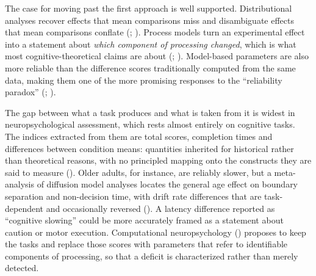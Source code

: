\documentclass[
  jou,
  floatsintext,
  longtable,
  nolmodern,
  notxfonts,
  notimes,
  12pt,
  colorlinks=true,linkcolor=blue,citecolor=blue,urlcolor=blue]{apa7}
\begin{document}
The case for moving past the first approach is well supported.
Distributional analyses recover effects that mean comparisons miss and
disambiguate effects that mean comparisons conflate
(;
). Process
models turn an experimental effect into a statement about \emph{which
component of processing changed}, which is what most
cognitive-theoretical claims are about
(;
).
Model-based parameters are also more reliable than the difference scores
traditionally computed from the same data, making them one of the more
promising responses to the ``reliability paradox''
(;
).

The gap between what a task produces and what is taken from it is widest
in neuropsychological assessment, which rests almost entirely on
cognitive tasks. The indices extracted from them are total scores,
completion times and differences between condition means: quantities
inherited for historical rather than theoretical reasons, with no
principled mapping onto the constructs they are said to measure
(). Older adults, for instance, are reliably slower, but a
meta-analysis of diffusion model analyses locates the general age effect
on boundary separation and non-decision time, with drift rate
differences that are task-dependent and occasionally reversed
(). A latency
difference reported as ``cognitive slowing'' could be more accurately
framed as a statement about caution or motor execution. Computational
neuropsychology () proposes to keep the tasks and replace those scores with
parameters that refer to identifiable components of processing, so that
a deficit is characterized rather than merely detected.
\end{document}
